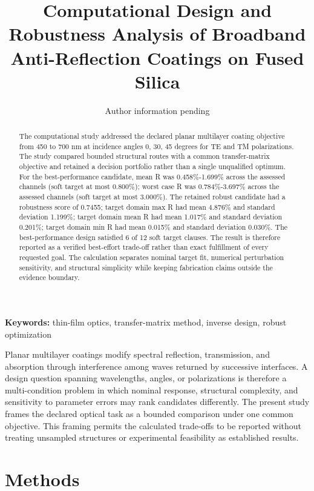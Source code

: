 \documentclass[11pt]{article}
\title{Computational Design and Robustness Analysis of Broadband Anti-Reflection Coatings on Fused Silica}
\author{Author information pending}
\date{}
\begin{document}
\maketitle

\begin{abstract}
The computational study addressed the declared planar multilayer coating objective from 450 to 700 nm at incidence angles 0, 30, 45 degrees for TE and TM polarizations. The study compared bounded structural routes with a common transfer-matrix objective and retained a decision portfolio rather than a single unqualified optimum. For the best-performance candidate, mean R was 0.458\%-1.699\% across the assessed channels (soft target at most 0.800\%); worst case R was 0.784\%-3.697\% across the assessed channels (soft target at most 3.000\%). The retained robust candidate had a robustness score of 0.7455; target domain max R had mean 4.876\% and standard deviation 1.199\%; target domain mean R had mean 1.017\% and standard deviation 0.201\%; target domain min R had mean 0.015\% and standard deviation 0.030\%. The best-performance design satisfied 6 of 12 soft target clauses. The result is therefore reported as a verified best-effort trade-off rather than exact fulfillment of every requested goal. The calculation separates nominal target fit, numerical perturbation sensitivity, and structural simplicity while keeping fabrication claims outside the evidence boundary.
\end{abstract}

\noindent\textbf{Keywords:} thin-film optics, transfer-matrix method, inverse design, robust optimization

Planar multilayer coatings modify spectral reflection, transmission, and absorption through interference among waves returned by successive interfaces. A design question spanning wavelengths, angles, or polarizations is therefore a multi-condition problem in which nominal response, structural complexity, and sensitivity to parameter errors may rank candidates differently. The present study frames the declared optical task as a bounded comparison under one common objective. This framing permits the calculated trade-offs to be reported without treating unsampled structures or experimental feasibility as established results.

\hypertarget{methods}{%
\section{Methods}\label{methods}}
\end{document}
